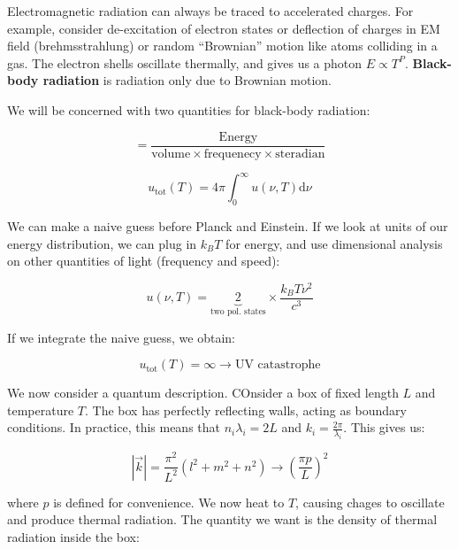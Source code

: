 \documentclass{article}
\begin{document}
Electromagnetic radiation can always be traced to accelerated charges. For example, consider de-excitation of electron states or deflection of charges in EM field (brehmsstrahlung) or random ``Brownian'' motion like atoms colliding in a gas. The electron shells oscillate thermally, and gives us a photon $E \propto T^{P}$. \textbf{Black-body radiation} is radiation only due to Brownian motion. 

We will be concerned with two quantities for black-body radiation:

\begin{equation}
    [u(\nu,T)] = \frac{\text{Energy}}{\text{volume}\times \text{frequenecy} \times \text{steradian}}
\end{equation}

\begin{equation}
    u_{\text{tot}}(T) = 4\pi \int_0^{\infty} u(\nu,T)  \mathrm{d}\nu 
\end{equation}

We can make a naive guess before Planck and Einstein. If we look at units of our energy distribution, we can plug in $k_B T$ for energy, and use dimensional analysis on other quantities of light (frequency and speed):

\begin{equation}
    u(\nu,T) = \underbrace{2}_{\text{two pol. states}} \times \frac{ k_B T \nu^2 }{c^3}
\end{equation}

If we integrate the naive guess, we obtain:

\begin{equation}
    u_{\text{tot}}(T) = \infty \rightarrow \text{UV catastrophe}
\end{equation}

We now consider a quantum description. COnsider a box of fixed length $L$ and temperature $T$. The box has perfectly reflecting walls, acting as boundary conditions. In practice, this means that $n_i\lambda_i = 2L$ and $k_i = \frac{2\pi}{\lambda_i}$. This gives us:

\begin{equation}
    |\vec{k}| = \frac{\pi^2}{L^2} \left( l^2 + m^2 + n^2 \right) \rightarrow \left(\frac{\pi p }{L}\right)^2
\end{equation}

where $p$ is defined for convenience. We now heat to $T$, causing chages to oscillate and produce thermal radiation. The quantity we want is the density of thermal radiation inside the box:
\end{document}
